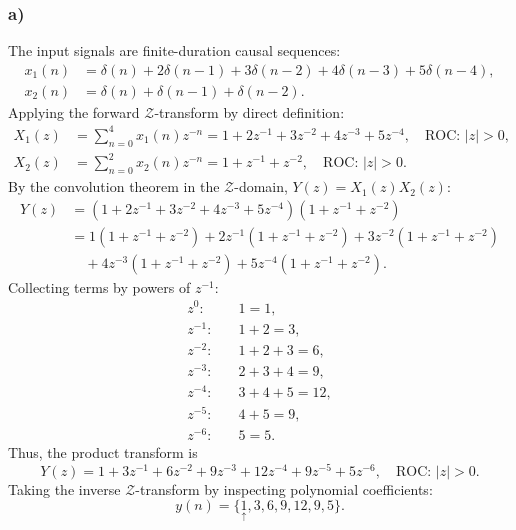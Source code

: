 \documentclass[12pt,a4paper]{article}
\newcommand{\org}[1]{\underset{\uparrow}{#1}}
\begin{document}
\subsubsection*{a)}
The input signals are finite-duration causal sequences:
\begin{align*}
    x_1(n) &= \delta(n) + 2\delta(n-1) + 3\delta(n-2) + 4\delta(n-3) + 5\delta(n-4), \\
    x_2(n) &= \delta(n) + \delta(n-1) + \delta(n-2).
\end{align*}
Applying the forward $\mathcal{Z}$-transform by direct definition:
\begin{align*}
    X_1(z) &= \sum_{n=0}^{4} x_1(n) z^{-n} = 1 + 2z^{-1} + 3z^{-2} + 4z^{-3} + 5z^{-4}, \quad \text{ROC: } |z| > 0, \\
    X_2(z) &= \sum_{n=0}^{2} x_2(n) z^{-n} = 1 + z^{-1} + z^{-2}, \quad \text{ROC: } |z| > 0.
\end{align*}
By the convolution theorem in the $\mathcal{Z}$-domain, $Y(z) = X_1(z) X_2(z)$:
\begin{align*}
    Y(z) &= (1 + 2z^{-1} + 3z^{-2} + 4z^{-3} + 5z^{-4})(1 + z^{-1} + z^{-2}) \\
         &= 1(1 + z^{-1} + z^{-2}) + 2z^{-1}(1 + z^{-1} + z^{-2}) + 3z^{-2}(1 + z^{-1} + z^{-2}) \\
         &\quad + 4z^{-3}(1 + z^{-1} + z^{-2}) + 5z^{-4}(1 + z^{-1} + z^{-2}).
\end{align*}
Collecting terms by powers of $z^{-1}$:
\begin{align*}
    z^0:    &\quad 1 = 1, \\
    z^{-1}: &\quad 1 + 2 = 3, \\
    z^{-2}: &\quad 1 + 2 + 3 = 6, \\
    z^{-3}: &\quad 2 + 3 + 4 = 9, \\
    z^{-4}: &\quad 3 + 4 + 5 = 12, \\
    z^{-5}: &\quad 4 + 5 = 9, \\
    z^{-6}: &\quad 5 = 5.
\end{align*}
Thus, the product transform is
\begin{equation}
    Y(z) = 1 + 3z^{-1} + 6z^{-2} + 9z^{-3} + 12z^{-4} + 9z^{-5} + 5z^{-6}, \quad \text{ROC: } |z| > 0.
\end{equation}
Taking the inverse $\mathcal{Z}$-transform by inspecting polynomial coefficients:
\begin{equation}
    y(n) = \{\org{1}, 3, 6, 9, 12, 9, 5\}.
\end{equation}
\end{document}
